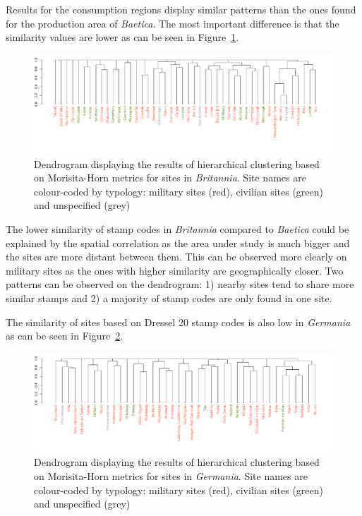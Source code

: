 \documentclass[review]{elsarticle}
\begin{document}
Results for the consumption regions display similar patterns than the ones found for the production area of \textit{Baetica}. The most important difference is that the similarity values are lower as can be seen in Figure~\ref{britmap}.


\begin{figure}
	\centering
\includegraphics[angle=180,width=\linewidth]{figs/dendrobrit5.pdf}
\caption{Dendrogram displaying the results of hierarchical clustering based on Morisita-Horn metrics for sites in \textit{Britannia}. Site names are colour-coded by typology: military sites (red), civilian sites (green) and unspecified (grey)}
\label{britmap}
\end{figure}

The lower similarity of stamp codes in \textit{Britannia} compared to \textit{Baetica} could be explained by the spatial correlation as the area under study is much bigger and the sites are more distant between them. This can be observed more clearly on military sites as the ones with higher similarity are geographically closer. Two patterns can be observed on the dendrogram: 1) nearby sites tend to share more similar stamps and 2) a majority of stamp codes are only found in one site.
 
The similarity of sites based on Dressel 20 stamp codes is also low in \textit{Germania} as can be seen in Figure~\ref{germap}. 

\begin{figure}
	\centering
\includegraphics[angle=180, width=\linewidth]{figs/dendroger5.pdf}
\caption{Dendrogram displaying the results of hierarchical clustering based on Morisita-Horn metrics for sites in \textit{Germania}. Site names are colour-coded by typology: military sites (red), civilian sites (green) and unspecified (grey)}
\label{germap}
\end{figure}
\end{document}
